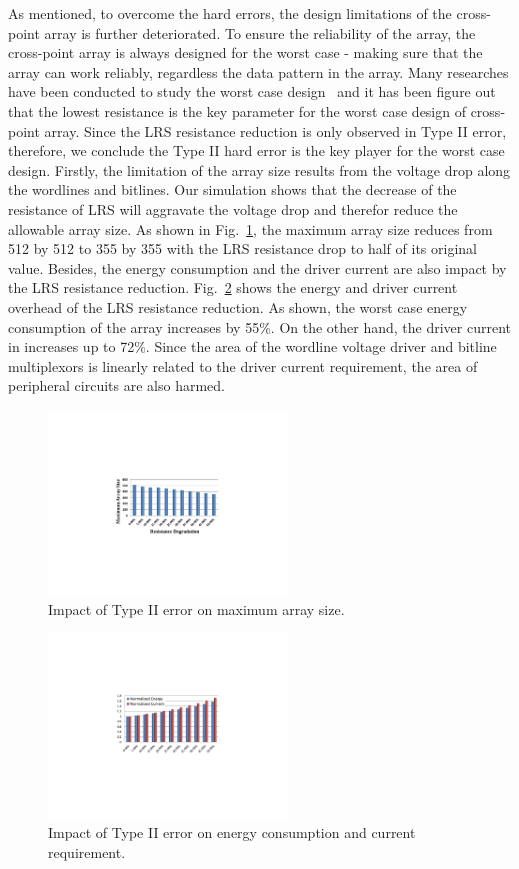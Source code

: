 As mentioned, to overcome the hard errors, the design limitations of the cross-point array is further deteriorated. To ensure the reliability of the array, the cross-point array is always designed for the worst case - making sure that the array can work reliably, regardless the data pattern in the array. Many researches have been conducted to study the worst case design~\cite{jiale, Dimin_ISLPED} and it has been figure out that the lowest resistance is the key parameter for the worst case design of cross-point array. Since the LRS resistance reduction is only observed in Type II error, therefore, we conclude the Type II hard error is the key player for the worst case design. Firstly, the limitation of the array size results from the voltage drop along the wordlines and bitlines. Our simulation shows that the decrease of the resistance of LRS will aggravate the voltage drop and therefor reduce the allowable array size. As shown in Fig.~\ref{fig:size}, the maximum array size reduces from 512 by 512 to 355 by 355 with the LRS resistance drop to half of its original value. Besides, the energy consumption and the driver current are also impact by the LRS resistance reduction. Fig.~\ref{fig:EC} shows the energy and driver current overhead of the LRS resistance reduction. As shown, the worst case energy consumption of the array increases by 55\%. On the other hand, the driver current in increases up to 72\%. Since the area of the wordline voltage driver and bitline multiplexors is linearly related to the driver current requirement, the area of peripheral circuits are also harmed.


\begin{figure}[!t]
\centering
    \includegraphics[width=2.5in]{./fig/size.pdf}
\caption{Impact of Type II error on maximum array size.}
\label{fig:size}
\end{figure}

\begin{figure}[!t]
\centering
    \includegraphics[width=2.5in]{./fig/EC.pdf}
\caption{Impact of Type II error on energy consumption and current requirement.}
\label{fig:EC}
\end{figure}
